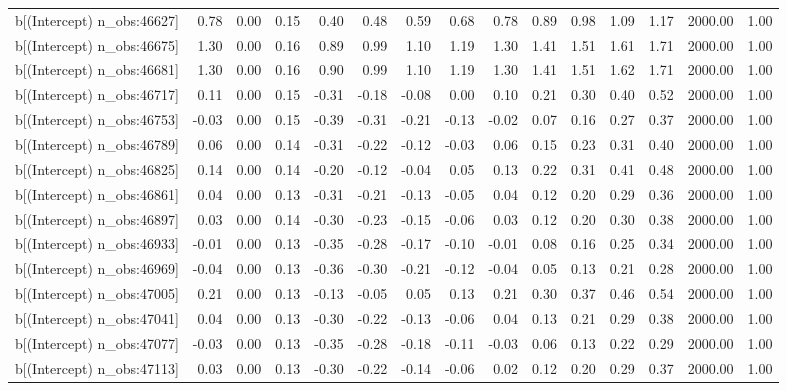 \begin{table}[ht]
\begin{tabular}{rrrrrrrrrrrrrrr}
  b[(Intercept) n\_obs:46627] & 0.78 & 0.00 & 0.15 & 0.40 & 0.48 & 0.59 & 0.68 & 0.78 & 0.89 & 0.98 & 1.09 & 1.17 & 2000.00 & 1.00 \\ 
  b[(Intercept) n\_obs:46675] & 1.30 & 0.00 & 0.16 & 0.89 & 0.99 & 1.10 & 1.19 & 1.30 & 1.41 & 1.51 & 1.61 & 1.71 & 2000.00 & 1.00 \\ 
  b[(Intercept) n\_obs:46681] & 1.30 & 0.00 & 0.16 & 0.90 & 0.99 & 1.10 & 1.19 & 1.30 & 1.41 & 1.51 & 1.62 & 1.71 & 2000.00 & 1.00 \\ 
  b[(Intercept) n\_obs:46717] & 0.11 & 0.00 & 0.15 & -0.31 & -0.18 & -0.08 & 0.00 & 0.10 & 0.21 & 0.30 & 0.40 & 0.52 & 2000.00 & 1.00 \\ 
  b[(Intercept) n\_obs:46753] & -0.03 & 0.00 & 0.15 & -0.39 & -0.31 & -0.21 & -0.13 & -0.02 & 0.07 & 0.16 & 0.27 & 0.37 & 2000.00 & 1.00 \\ 
  b[(Intercept) n\_obs:46789] & 0.06 & 0.00 & 0.14 & -0.31 & -0.22 & -0.12 & -0.03 & 0.06 & 0.15 & 0.23 & 0.31 & 0.40 & 2000.00 & 1.00 \\ 
  b[(Intercept) n\_obs:46825] & 0.14 & 0.00 & 0.14 & -0.20 & -0.12 & -0.04 & 0.05 & 0.13 & 0.22 & 0.31 & 0.41 & 0.48 & 2000.00 & 1.00 \\ 
  b[(Intercept) n\_obs:46861] & 0.04 & 0.00 & 0.13 & -0.31 & -0.21 & -0.13 & -0.05 & 0.04 & 0.12 & 0.20 & 0.29 & 0.36 & 2000.00 & 1.00 \\ 
  b[(Intercept) n\_obs:46897] & 0.03 & 0.00 & 0.14 & -0.30 & -0.23 & -0.15 & -0.06 & 0.03 & 0.12 & 0.20 & 0.30 & 0.38 & 2000.00 & 1.00 \\ 
  b[(Intercept) n\_obs:46933] & -0.01 & 0.00 & 0.13 & -0.35 & -0.28 & -0.17 & -0.10 & -0.01 & 0.08 & 0.16 & 0.25 & 0.34 & 2000.00 & 1.00 \\ 
  b[(Intercept) n\_obs:46969] & -0.04 & 0.00 & 0.13 & -0.36 & -0.30 & -0.21 & -0.12 & -0.04 & 0.05 & 0.13 & 0.21 & 0.28 & 2000.00 & 1.00 \\ 
  b[(Intercept) n\_obs:47005] & 0.21 & 0.00 & 0.13 & -0.13 & -0.05 & 0.05 & 0.13 & 0.21 & 0.30 & 0.37 & 0.46 & 0.54 & 2000.00 & 1.00 \\ 
  b[(Intercept) n\_obs:47041] & 0.04 & 0.00 & 0.13 & -0.30 & -0.22 & -0.13 & -0.06 & 0.04 & 0.13 & 0.21 & 0.29 & 0.38 & 2000.00 & 1.00 \\ 
  b[(Intercept) n\_obs:47077] & -0.03 & 0.00 & 0.13 & -0.35 & -0.28 & -0.18 & -0.11 & -0.03 & 0.06 & 0.13 & 0.22 & 0.29 & 2000.00 & 1.00 \\ 
  b[(Intercept) n\_obs:47113] & 0.03 & 0.00 & 0.13 & -0.30 & -0.22 & -0.14 & -0.06 & 0.02 & 0.12 & 0.20 & 0.29 & 0.37 & 2000.00 & 1.00 \\ 

\end{tabular}
\end{table}
